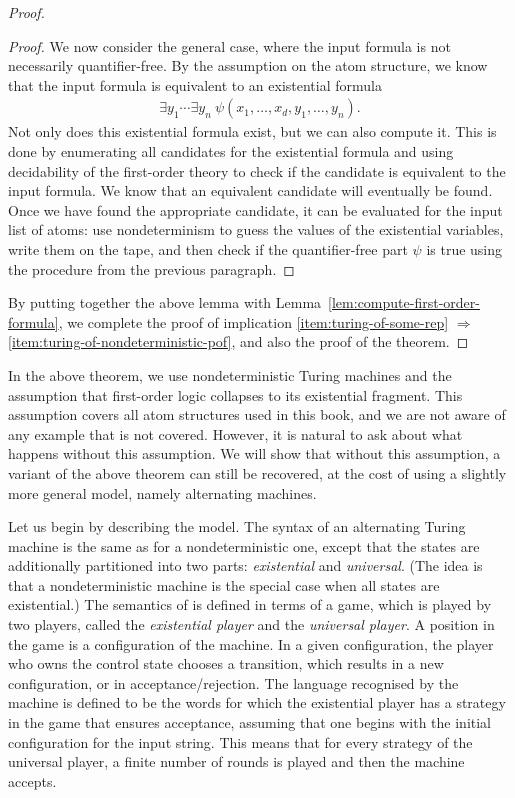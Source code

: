 \begin{proof}
\begin{proof}
		We now consider the general case, where the input formula is not necessarily quantifier-free.
		By the assumption on the atom structure, we  know that the input formula is equivalent to an existential formula  
		\begin{align*}
		\exists y_1 \cdots \exists y_n\  \psi(x_1,\ldots,x_d,y_1,\ldots,y_n).
		\end{align*}
		Not only does this existential formula exist, but we can also compute it. This is done by enumerating all candidates for the existential formula and using decidability of the first-order theory to check if the candidate is equivalent to the input formula. We know that an equivalent candidate will eventually be found. Once we have found the appropriate candidate, it can be evaluated for the input list of atoms: use  nondeterminism to guess the values of the existential variables, write them on the tape, and then check if the quantifier-free part $\psi$ is true using the procedure from the previous paragraph. 
	\end{proof}

		By putting together the above lemma with Lemma~\ref{lem:compute-first-order-formula}, we complete the proof of 
	implication \ref{item:turing-of-some-rep} $\Rightarrow$ \ref{item:turing-of-nondeterministic-pof}, and also the proof of  the theorem. 
\end{proof}


In the above theorem, we use nondeterministic Turing machines and the assumption that first-order logic collapses to its existential fragment.  This assumption covers all atom structures used in this book, and we are not aware of any example that is not covered. However, it is natural to ask about what happens without this assumption. We will show that without this assumption, a variant of the above theorem can still be recovered, at the cost of using a slightly more general model, namely alternating machines. 

Let us begin by describing the model. The syntax of an alternating Turing machine is the same as for a nondeterministic one, except that the states are additionally partitioned into two parts: \emph{existential} and \emph{universal}. (The idea is that a nondeterministic machine is the special case when all states are existential.)
	The semantics of  is defined in terms of a game, which is played by two players, called the \emph{existential player} and the \emph{universal player}. A position in the game is a configuration of the machine. In a given configuration, the player who owns the control state chooses a transition, which results in a new configuration, or in acceptance/rejection. The language recognised by the machine is defined to be the words for which the existential player has a strategy in the game that ensures acceptance, assuming that one begins with the initial configuration for the input string. This means that for every strategy of the universal player, a finite number of rounds is played and then the machine accepts.



